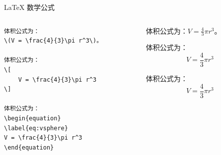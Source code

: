 \begin{frame}[fragile]{\LaTeX{} 数学公式}

    \begin{columns}
        \begin{column}{.5\textwidth}
            \lstset{language=[LaTeX]TeX}
            \begin{lstlisting}[basicstyle=\ttfamily\small]
体积公式为：
\(V = \frac{4}{3}\pi r^3\)。

体积公式为：
\[
    V = \frac{4}{3}\pi r^3
\]

体积公式为：
\begin{equation}
\label{eq:vsphere}
V = \frac{4}{3}\pi r^3
\end{equation}\end{lstlisting}
        \end{column}
        \begin{column}{.5\textwidth}
            体积公式为：\(V = \frac{4}{3}\pi r^3\)。

            体积公式为：
            \[
                V = \frac{4}{3}\pi r^3
            \]

            体积公式为：
            \begin{equation}
                \label{eq:vsphere}
                V = \frac{4}{3}\pi r^3
            \end{equation}
        \end{column}
    \end{columns}

\end{frame}


